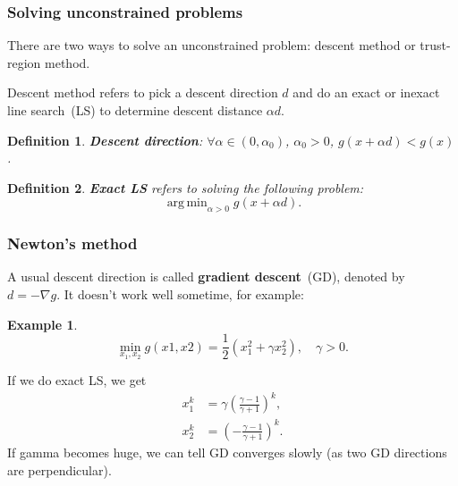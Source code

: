 \documentclass{fancydoc}
\newtheorem{mydef}{Definition}
\newtheorem{ex}{Example}
\DeclareMathOperator*{\argmin}{arg\,min}
\begin{document}
\subsubsection{Solving unconstrained problems}
There are two ways to solve an unconstrained problem: descent method or trust-region method.

Descent method refers to pick a descent direction $d$ and do an exact or inexact line search~(LS) to determine descent distance $\alpha d$.
\bigbreak
\begin{mydef}
	\textbf{Descent direction}: $\forall \alpha \in (0, \alpha_0)$, $\alpha_0 > 0$, $g(x+\alpha d) < g(x)$.
\end{mydef}
\begin{mydef}
	\textbf{Exact LS} refers to solving the following problem:
	\begin{equation*}
	\argmin_{\alpha>0} g(x+\alpha d).
	\end{equation*}
\end{mydef}

\subsubsection{Newton's method}
A usual descent direction is called \textbf{gradient descent}~(GD), denoted by $d=-\nabla g$. It doesn't work well sometime, for example:
\begin{ex}
	\begin{equation}
	\min_{x_1, x_2} g(x1, x2) = \frac{1}{2}(x_1^2 + \gamma x_2^2), \quad \gamma > 0.
	\end{equation}
\end{ex}
If we do exact LS, we get
\begin{subequations}
\begin{align}
x_1^k &= \gamma (\frac{\gamma - 1}{\gamma + 1})^k, \\
x_2^k &= (-\frac{\gamma - 1}{\gamma + 1})^k.
\end{align}
\end{subequations}
If gamma becomes huge, we can tell GD converges slowly (as two GD directions are perpendicular).
\bigbreak 
\end{document}

